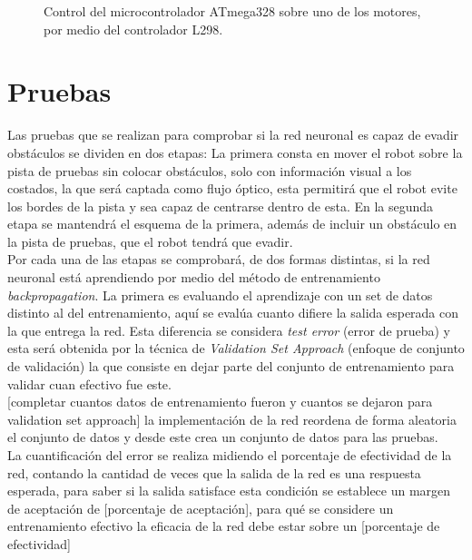 \documentclass{iccmemoria}
\begin{document}
\begin{figure}[H]
  \centering
  \selectfont{
  
  }
  \caption{Control del microcontrolador ATmega328 sobre uno de los motores, por medio del controlador L298.}
  \label{fig:ATmega328_L298}
\end{figure}

\chapter{Pruebas}

Las pruebas que se realizan para comprobar si la red neuronal es capaz de evadir obstáculos se dividen en dos etapas: La primera consta en mover el robot sobre la pista de pruebas sin colocar obstáculos, solo con información visual a los costados, la que será captada como flujo óptico, esta permitirá que el robot evite los bordes de la pista y sea capaz de centrarse dentro de esta. En la segunda etapa se mantendrá el esquema de la primera, además de incluir un obstáculo en la pista de pruebas, que el robot tendrá que evadir.\\

Por cada una de las etapas se comprobará, de dos formas distintas, si la red neuronal está aprendiendo por medio del método de entrenamiento \emph{backpropagation}. La primera es evaluando el aprendizaje con un set de datos distinto al del entrenamiento, aquí se evalúa cuanto difiere la salida esperada con la que entrega la red. Esta diferencia se considera \emph{test error} (error de prueba) y esta será obtenida por la técnica de \emph{Validation Set Approach} (enfoque de conjunto de validación) la que consiste en dejar parte del conjunto de entrenamiento para validar cuan efectivo fue este.\\

[completar cuantos datos de entrenamiento fueron y cuantos se dejaron para validation set approach]
la implementación de la red reordena de forma aleatoria el conjunto de datos y desde este crea un conjunto de datos para las pruebas.\\

La cuantificación del error se realiza midiendo el porcentaje de efectividad de la red, contando la cantidad de veces que la salida de la red es una respuesta esperada, para saber si la salida satisface esta condición se establece un margen de aceptación de [porcentaje de aceptación], para qué se considere un entrenamiento efectivo la eficacia de la red debe estar sobre un [porcentaje de efectividad]\\ 
\end{document}
